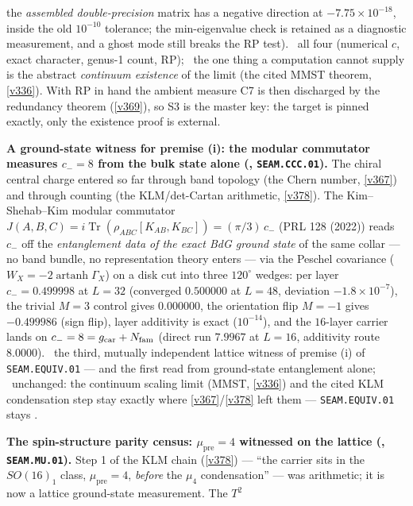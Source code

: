 the \emph{assembled double-precision} matrix has a negative direction at $-7.75\times10^{-18}$, inside the
old $10^{-10}$ tolerance; the min-eigenvalue check is retained as a diagnostic measurement, and a ghost
mode still breaks the RP test). \mE\ all four (numerical $c$,
exact character, genus-1 count, RP); \mO\ the one thing a computation cannot supply is the abstract
\emph{continuum existence} of the limit (the cited MMST theorem, \vref{v336}). With RP in hand the ambient
measure C7 is then discharged by the redundancy theorem (\vref{v369}), so S3 is the master key: the target
is pinned exactly, only the existence proof is external.
\par\smallskip\noindent\textbf{A ground-state witness for premise (i): the modular commutator measures
$c_-{=}8$ from the bulk state alone (, \texttt{SEAM.CCC.01}).}
The chiral central charge entered so far through band topology (the Chern number, \vref{v367}) and through
counting (the KLM/det-Cartan arithmetic, \vref{v378}). The Kim--Shehab--Kim modular commutator
$J(A,B,C)=i\operatorname{Tr}(\rho_{ABC}[K_{AB},K_{BC}])=(\pi/3)\,c_-$ (PRL 128 (2022)) reads $c_-$ off the
\emph{entanglement data of the exact BdG ground state} of the same collar --- no band bundle, no
representation theory enters --- via the Peschel covariance ($W_X=-2\operatorname{artanh}\Gamma_X$) on a
disk cut into three $120^\circ$ wedges: per layer $c_-=0.499998$ at $L{=}32$ (converged $0.500000$ at
$L{=}48$, deviation $-1.8\times10^{-7}$), the trivial $M{=}3$ control gives $0.000000$, the orientation
flip $M{=}{-}1$ gives $-0.499986$ (sign flip), layer additivity is exact ($10^{-14}$), and the $16$-layer
carrier lands on $c_-=8=g_{\mathrm{car}}+N_{\mathrm{fam}}$ (direct run $7.9967$ at $L{=}16$, additivity route $8.0000$). \mE\ the
third, mutually independent lattice witness of premise (i) of \texttt{SEAM.EQUIV.01} --- and the first read
from ground-state entanglement alone; \mO\ unchanged: the continuum scaling limit (MMST, \vref{v336}) and
the cited KLM condensation step stay exactly where \vref{v367}/\vref{v378} left them ---
\texttt{SEAM.EQUIV.01} stays \mO.
\par\smallskip\noindent\textbf{The spin-structure parity census: $\mu_{\mathrm{pre}}{=}4$ witnessed on the
lattice (, \texttt{SEAM.MU.01}).} Step 1 of the KLM chain
(\vref{v378}) --- ``the carrier sits in the $SO(16)_1$ class, $\mu_{\mathrm{pre}}{=}4$, \emph{before} the
$\mu_4$ condensation'' --- was arithmetic; it is now a lattice ground-state measurement. The $T^2$
